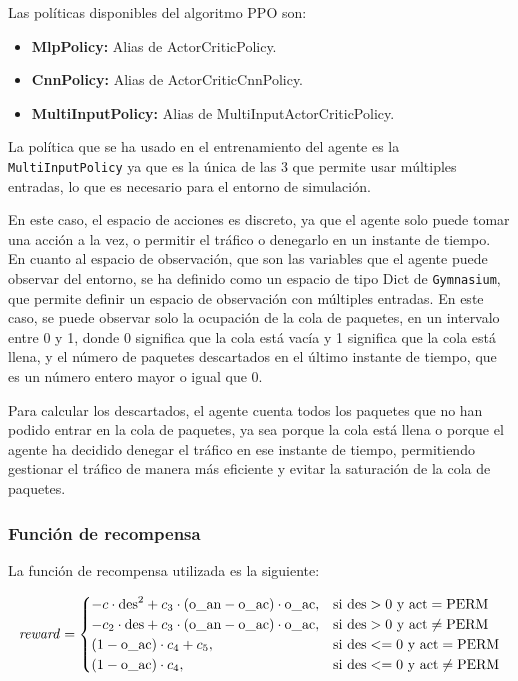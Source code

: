 Las políticas disponibles del algoritmo PPO son:
\begin{itemize}
    \item \textbf{MlpPolicy:} Alias de ActorCriticPolicy.
    \item \textbf{CnnPolicy:} Alias de ActorCriticCnnPolicy.
    \item \textbf{MultiInputPolicy:} Alias de MultiInputActorCriticPolicy.
\end{itemize}
La política que se ha usado en el entrenamiento del agente es la \texttt{MultiInputPolicy} ya que es la única de las 3 que permite usar múltiples entradas, lo que es necesario para el entorno de simulación.

En este caso, el espacio de acciones es discreto, ya que el agente solo puede tomar una acción a la vez, o permitir el tráfico o denegarlo en un instante de tiempo. En cuanto al espacio de observación, que son las variables que el agente puede observar del entorno, se ha definido como un espacio de tipo Dict de \texttt{Gymnasium}, que permite definir un espacio de observación con múltiples entradas. En este caso, se puede observar solo la ocupación de la cola de paquetes, en un intervalo entre 0 y 1, donde 0 significa que la cola está vacía y 1 significa que la cola está llena, y el número de paquetes descartados en el último instante de tiempo, que es un número entero mayor o igual que 0.

Para calcular los descartados, el agente cuenta todos los paquetes que no han podido entrar en la cola de paquetes, ya sea porque la cola está llena o porque el agente ha decidido denegar el tráfico en ese instante de tiempo, permitiendo gestionar el tráfico de manera más eficiente y evitar la saturación de la cola de paquetes.

\subsubsection{Función de recompensa}
La función de recompensa utilizada es la siguiente: 

\[
\text{\textit{reward}} = 
\begin{cases}
    -c \cdot \text{des}^2 + c_3 \cdot (\text{o\_an} - \text{o\_ac}) \cdot \text{o\_ac}, & \text{si } \text{des} > 0 \text{ y } \text{act} = \text{PERM} \\
    -c_2 \cdot \text{des} + c_3 \cdot (\text{o\_an} - \text{o\_ac}) \cdot \text{o\_ac}, & \text{si } \text{des} > 0 \text{ y } \text{act} \ne \text{PERM} \\
    (1 - \text{o\_ac}) \cdot c_4 + c_5, & \text{si } \text{des} <= 0 \text{ y } \text{act} = \text{PERM} \\
    (1 - \text{o\_ac}) \cdot c_4, & \text{si } \text{des} <= 0 \text{ y } \text{act} \ne \text{PERM}
\end{cases}
\]

